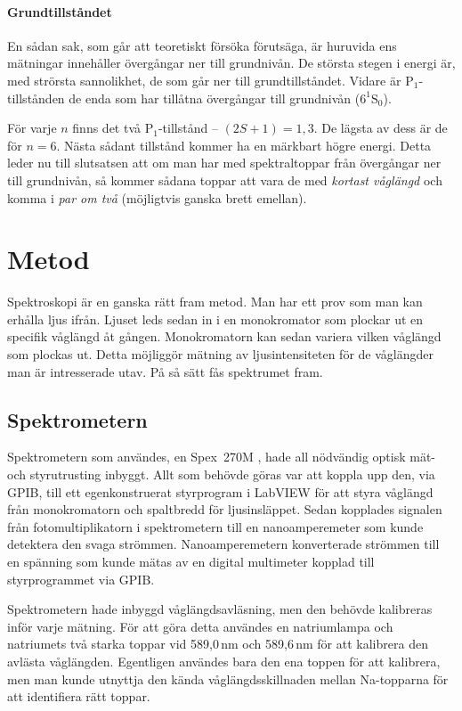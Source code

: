 \documentclass[11pt,a4paper]{article}
\begin{document}
\paragraph{Grundtillståndet}
En sådan sak, som går att teoretiskt försöka förutsäga, är huruvida
ens mätningar innehåller övergångar ner till grundnivån. De största
stegen i energi är, med strörsta sannolikhet, de som går ner till
grundtillståndet. Vidare är $\mathrm{P}_1$-tillstånden de enda som har
tillåtna övergångar till grundnivån ($6^1\mathrm{S}_0$).

För varje $n$ finns det två $\mathrm{P}_1$-tillstånd -- 
$(2S +1) = 1, 3$. De lägsta av dess är de för $n=6$. Nästa sådant
tillstånd kommer ha en märkbart högre energi. Detta leder nu till
slutsatsen att om man har med spektraltoppar från övergångar ner till
grundnivån, så kommer sådana toppar att vara de med \emph{kortast
  våglängd} och komma i \emph{par om två} (möjligtvis ganska brett
emellan).


\section{Metod}
Spektroskopi är en ganska rätt fram metod. Man har ett prov som man
kan erhålla ljus ifrån. Ljuset leds sedan in i en monokromator som
plockar ut en specifik våglängd åt gången. Monokromatorn kan sedan
variera vilken våglängd som plockas ut. Detta möjliggör mätning av
ljusintensiteten för de våglängder man är intresserade utav. På så
sätt fås spektrumet fram.

\subsection{Spektrometern}

Spektrometern som användes, en Spex~270M \cite{Spex270M}, hade all
nödvändig optisk mät- och styrutrusting inbyggt. Allt som behövde
göras var att koppla upp den, via GPIB, till ett egenkonstruerat
styrprogram i LabVIEW 
för att styra våglängd från monokromatorn och spaltbredd för
ljusinsläppet. Sedan kopplades signalen från fotomultiplikatorn i
spektrometern till en nanoamperemeter som kunde detektera den svaga
strömmen. Nanoamperemetern konverterade strömmen till en spänning som
kunde mätas av en digital multimeter kopplad till styrprogrammet via
GPIB. 

Spektrometern hade inbyggd våglängdsavläsning, men den behövde
kalibreras inför varje mätning. För att göra detta användes en
natriumlampa och natriumets två starka toppar vid 589,0\,nm och
589,6\,nm för att kalibrera den avlästa våglängden. Egentligen
användes bara den ena toppen för att kalibrera, men man kunde utnyttja
den kända våglängdsskillnaden mellan Na-topparna för att identifiera
rätt toppar. 
\end{document}
